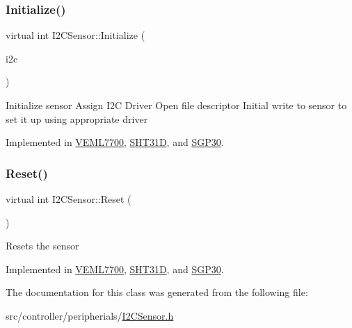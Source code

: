 \subsubsection{\texorpdfstring{Initialize()}{Initialize()}}
{\footnotesize\ttfamily virtual int I2\+C\+Sensor\+::\+Initialize (\begin{DoxyParamCaption}\item[{\hyperlink{classI2CDriver}{I2\+C\+Driver} \&}]{i2c }\end{DoxyParamCaption})\hspace{0.3cm}{\ttfamily [pure virtual]}}

Initialize sensor Assign I2C Driver Open file descriptor Initial write to sensor to set it up using appropriate driver 

Implemented in \hyperlink{classVEML7700_af772ec5fe2bac04428479c9d232f1799}{V\+E\+M\+L7700}, \hyperlink{classSHT31D_af3ec39a4f04344a1b422761cc904343e}{S\+H\+T31D}, and \hyperlink{classSGP30_ad34fe8539ef007f55a0b3140889fdd6f}{S\+G\+P30}.

\mbox{\label{classI2CSensor_a0622266d335944782d2bfa6352f01095}} 
\subsubsection{\texorpdfstring{Reset()}{Reset()}}
{\footnotesize\ttfamily virtual int I2\+C\+Sensor\+::\+Reset (\begin{DoxyParamCaption}{ }\end{DoxyParamCaption})\hspace{0.3cm}{\ttfamily [pure virtual]}}

Resets the sensor 

Implemented in \hyperlink{classVEML7700_a381358f8998260f4600a0d6713f7ea2a}{V\+E\+M\+L7700}, \hyperlink{classSHT31D_aa5d28c2557ed05435ca9b433492b9b07}{S\+H\+T31D}, and \hyperlink{classSGP30_a4934ef3a64eb0782a6d956c6526e4186}{S\+G\+P30}.



The documentation for this class was generated from the following file\+:\begin{DoxyCompactItemize}
\item 
src/controller/peripherials/\hyperlink{I2CSensor_8h}{I2\+C\+Sensor.\+h}\end{DoxyCompactItemize}
